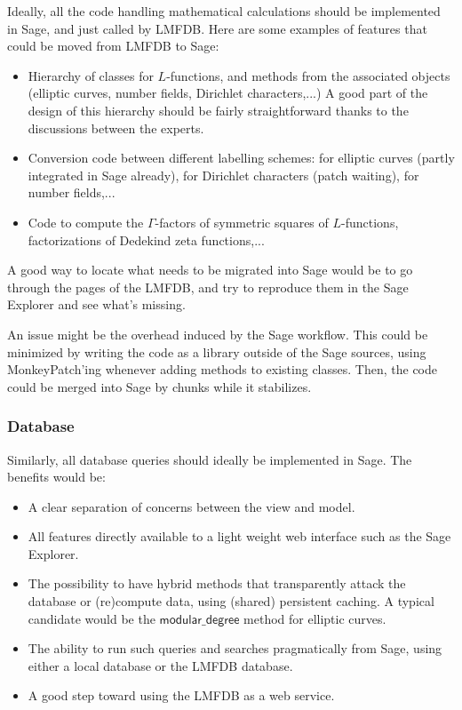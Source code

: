 \documentclass{article}
\newcommand{\sagecommand}[1]{$\textsf{#1}$}
\begin{document}
Ideally, all the code handling mathematical calculations should be
implemented in Sage, and just called by LMFDB. Here are some examples
of features that could be moved from LMFDB to Sage:

\begin{itemize}
\item Hierarchy of classes for $L$-functions, and methods from the associated objects (elliptic curves, number fields, Dirichlet characters,...) A good part of the design of this hierarchy should be fairly straightforward thanks to the discussions between the experts.
\item Conversion code between different labelling schemes: for elliptic curves (partly integrated in Sage already), for Dirichlet characters (patch waiting), for number fields,...
\item Code to compute the $\Gamma$-factors of symmetric squares of $L$-functions, factorizations of Dedekind zeta functions,...
\end{itemize}

A good way to locate what needs to be migrated into Sage would be to go through the pages of the LMFDB, and try to reproduce them in the Sage Explorer and see what's missing.

An issue might be the overhead induced by the Sage workflow. This
could be minimized by writing the code as a library outside of the
Sage sources, using MonkeyPatch'ing whenever adding methods to
existing classes. Then, the code could be merged into Sage by chunks
while it stabilizes.

\subsubsection{Database}

Similarly, all database queries should ideally be implemented in Sage.
The benefits would be:
\begin{itemize}
\item A clear separation of concerns between the view and model.
\item All features directly available to a light weight web interface
  such as the Sage Explorer.
\item The possibility to have hybrid methods that transparently attack
  the database or (re)compute data, using (shared) persistent caching. A
  typical candidate would be the \sagecommand{modular\_degree} method for elliptic
  curves.
\item The ability to run such queries and searches pragmatically from
  Sage, using either a local database or the LMFDB database.
\item A good step toward using the LMFDB as a web service.
\end{itemize}
\end{document}
